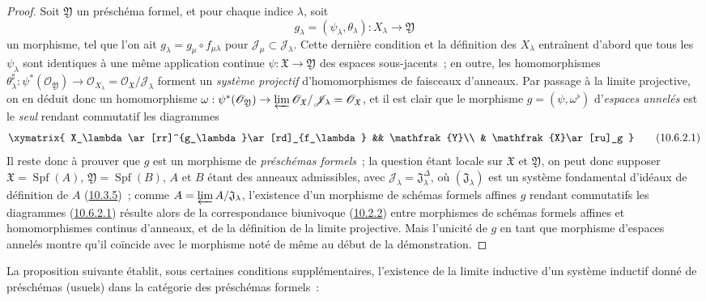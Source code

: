 \begin{proof}
Soit $\mathfrak{Y}$ un préschéma formel, et pour chaque indice $\lambda$,
soit
\[
  g_\lambda=(\psi_\lambda,\theta_\lambda):X_\lambda\to\mathfrak{Y}
\]
un morphisme, tel que l'on ait
$g_\lambda=g_\mu\circ f_{\mu\lambda}$ pour
$\mathscr{J}_\mu\subset\mathscr{J}_\lambda$. Cette dernière condition
et la définition des $X_\lambda$ entraînent d'abord que tous les
$\psi_\lambda$ sont identiques à une même application continue
$\psi:\mathfrak{X}\to\mathfrak{Y}$ des espaces sous-jacents~; en outre,
les homomorphismes
$\theta_\lambda^\sharp:\psi^*(\mathscr{O}_{\mathfrak{Y}})\to
\mathscr{O}_{X_\lambda}=
\mathscr{O}_{\mathfrak{X}}/\mathscr{J}_\lambda$ forment un
\emph{système projectif} d'homomorphismes de faisceaux d'anneaux. Par
passage à la limite projective, on en déduit donc un homomorphisme
$\omega:\psi^*(\mathscr{O}_{\mathfrak{Y}})\to
  \varprojlim\mathscr{O}_{\mathfrak{X}}/\mathscr{J}_\lambda
  =\mathscr{O}_{\mathfrak{X}}$,
et il est clair que le morphisme $g=(\psi,\omega^\flat)$ d'\emph{espaces
annelés} est le \emph{seul} rendant commutatif les diagrammes
\[
  \label{I.10.6.2.1-fr}
  \xymatrix{
    X_\lambda\ar[rr]^{g_\lambda}\ar[rd]_{f_\lambda} &&
    \mathfrak{Y}\\
    & \mathfrak{X}\ar[ru]_g
  }
  \tag{10.6.2.1}
\]
Il reste donc à prouver que $g$ est un morphisme de \emph{préschémas
formels}~; la question étant locale sur $\mathfrak{X}$ et
$\mathfrak{Y}$, on peut donc supposer
$\mathfrak{X}=\operatorname{Spf}(A)$,
$\mathfrak{Y}=\operatorname{Spf}(B)$, $A$ et $B$ étant des anneaux
admissibles, avec
$\mathscr{J}_\lambda=\mathfrak{J}_\lambda^{\Delta}$, où
$(\mathfrak{J}_\lambda)$ est un système fondamental d'idéaux de
définition de $A$ (\hyperref[I.10.3.5-fr]{10.3.5})~; comme
$A=\varprojlim A/\mathfrak{J}_\lambda$, l'existence d'un morphisme de
schémas formels affines $g$ rendant commutatifs les diagrammes
(\hyperref[I.10.6.2.1-fr]{10.6.2.1}) résulte alors de la correspondance
biunivoque (\hyperref[I.10.2.2-fr]{10.2.2}) entre morphismes de schémas
formels affines et homomorphismes continus d'anneaux, et de la définition
de la limite projective. Mais l'unicité de $g$ en tant que morphisme
d'espaces annelés montre qu'il coïncide avec le morphisme noté de même au
début de la démonstration.
\end{proof}

La proposition suivante établit, sous certaines conditions
supplémentaires, l'existence de la limite inductive d'un système inductif
donné de préschémas (usuels) dans la catégorie des préschémas formels~:

